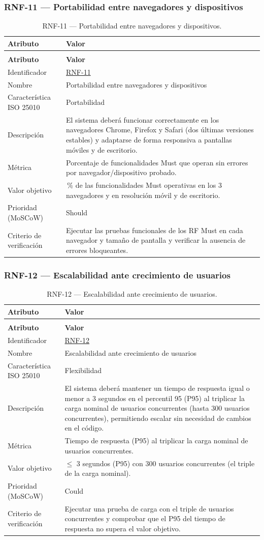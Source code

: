 \documentclass[journal,onecolumn]{IEEEtran}
\makeatletter
\newenvironment{atributos}[2]{%
	\small
	\begin{longtable}{@{}>{\raggedright\arraybackslash}p{4.2cm} >{\raggedright\arraybackslash}p{11.2cm}@{}}
		\caption{#2}\label{tab:#1}\\
		\toprule
		\textbf{Atributo} & \textbf{Valor} \\
		\midrule
		\endfirsthead
		\multicolumn{2}{@{}l}{\small\itshape (continuación)}\\
		\toprule
		\textbf{Atributo} & \textbf{Valor} \\
		\midrule
		\endhead
		\bottomrule
		\endlastfoot
	}{%
	\end{longtable}
	\normalsize
}
\makeatother
\begin{document}
	\subsubsection{RNF-11 --- Portabilidad entre navegadores y dispositivos}
	
	\begin{atributos}{RNF-11}{RNF-11 --- Portabilidad entre navegadores y dispositivos.}
		Identificador & \hyperref[tab:RNF-11]{RNF-11} \\
		Nombre & Portabilidad entre navegadores y dispositivos \\
		Característica ISO 25010 & Portabilidad \\
		Descripción & El sistema deberá funcionar correctamente en los navegadores Chrome, Firefox y Safari (dos últimas versiones estables) y adaptarse de forma responsiva a pantallas móviles y de escritorio. \\
		Métrica & Porcentaje de funcionalidades Must que operan sin errores por navegador/dispositivo probado. \\
		Valor objetivo & 100\,\% de las funcionalidades Must operativas en los 3 navegadores y en resolución móvil y de escritorio. \\
		Prioridad (MoSCoW) & Should \\
		Criterio de verificación & Ejecutar las pruebas funcionales de los RF Must en cada navegador y tamaño de pantalla y verificar la ausencia de errores bloqueantes. \\
	\end{atributos}
	
	\subsubsection{RNF-12 --- Escalabilidad ante crecimiento de usuarios}
	
	\begin{atributos}{RNF-12}{RNF-12 --- Escalabilidad ante crecimiento de usuarios.}
		Identificador & \hyperref[tab:RNF-12]{RNF-12} \\
		Nombre & Escalabilidad ante crecimiento de usuarios \\
		Característica ISO 25010 & Flexibilidad \\
		Descripción & El sistema deberá mantener un tiempo de respuesta igual o menor a 3 segundos en el percentil 95 (P95) al triplicar la carga nominal de usuarios concurrentes (hasta 300 usuarios concurrentes), permitiendo escalar sin necesidad de cambios en el código. \\
		Métrica & Tiempo de respuesta (P95) al triplicar la carga nominal de usuarios concurrentes. \\
		Valor objetivo & $\leq$ 3 segundos (P95) con 300 usuarios concurrentes (el triple de la carga nominal). \\
		Prioridad (MoSCoW) & Could \\
		Criterio de verificación & Ejecutar una prueba de carga con el triple de usuarios concurrentes y comprobar que el P95 del tiempo de respuesta no supera el valor objetivo. \\
	\end{atributos}
	
\end{document}
